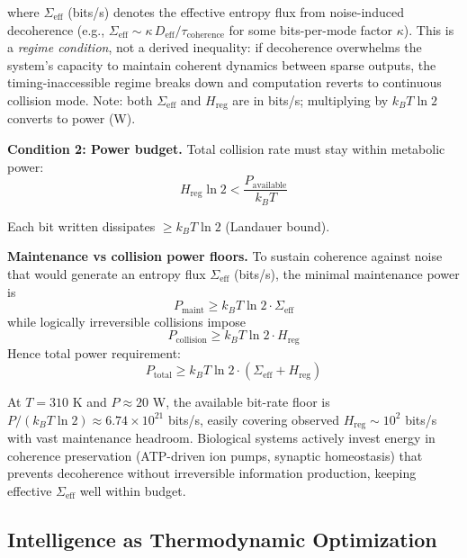 \documentclass[12pt]{article}
\begin{document}
where $\Sigma_{\text{eff}}$ (bits/s) denotes the effective entropy flux from noise-induced decoherence (e.g., $\Sigma_{\text{eff}}\!\sim\!\kappa\,D_{\text{eff}}/\tau_{\text{coherence}}$ for some bits-per-mode factor $\kappa$). This is a \textit{regime condition}, not a derived inequality: if decoherence overwhelms the system's capacity to maintain coherent dynamics between sparse outputs, the timing-inaccessible regime breaks down and computation reverts to continuous collision mode. Note: both $\Sigma_{\text{eff}}$ and $H_{\text{reg}}$ are in bits/s; multiplying by $k_B T \ln 2$ converts to power (W).

\textbf{Condition 2: Power budget.} Total collision rate must stay within metabolic power:
\begin{equation}
H_{\text{reg}} \ln 2 < \frac{P_{\text{available}}}{k_B T}
\end{equation}

Each bit written dissipates $\geq k_B T \ln 2$ (Landauer bound).

\textbf{Maintenance vs collision power floors.} To sustain coherence against noise that would generate an entropy flux $\Sigma_{\text{eff}}$ (bits/s), the minimal maintenance power is
\begin{equation}
P_{\text{maint}} \ge k_B T \ln 2 \cdot \Sigma_{\text{eff}}
\end{equation}
while logically irreversible collisions impose
\begin{equation}
P_{\text{collision}} \ge k_B T \ln 2 \cdot H_{\text{reg}}
\end{equation}
Hence total power requirement:
\begin{equation}
P_{\text{total}} \ge k_B T \ln 2 \cdot (\Sigma_{\text{eff}} + H_{\text{reg}})
\end{equation}

At $T = 310$ K and $P \approx 20$ W, the available bit-rate floor is $P/(k_B T \ln 2) \approx 6.74 \times 10^{21}$ bits/s, easily covering observed $H_{\text{reg}} \sim 10^2$ bits/s with vast maintenance headroom. Biological systems actively invest energy in coherence preservation (ATP-driven ion pumps, synaptic homeostasis) that prevents decoherence without irreversible information production, keeping effective $\Sigma_{\text{eff}}$ well within budget.

\subsection{Intelligence as Thermodynamic Optimization}
\end{document}
